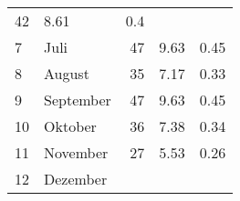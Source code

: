\begin{longtable}{lXrrr}
       \num{42} &
       \num[round-mode=places,round-precision=2]{8.61} &
         \num[round-mode=places,round-precision=2]{0.4} \\

     7 &
     \multicolumn{1}{X}{ Juli   } &


       \num{47} &
       \num[round-mode=places,round-precision=2]{9.63} &
         \num[round-mode=places,round-precision=2]{0.45} \\

     8 &
     \multicolumn{1}{X}{ August   } &


       \num{35} &
       \num[round-mode=places,round-precision=2]{7.17} &
         \num[round-mode=places,round-precision=2]{0.33} \\

     9 &
     \multicolumn{1}{X}{ September   } &


       \num{47} &
       \num[round-mode=places,round-precision=2]{9.63} &
         \num[round-mode=places,round-precision=2]{0.45} \\

     10 &
     \multicolumn{1}{X}{ Oktober   } &


       \num{36} &
       \num[round-mode=places,round-precision=2]{7.38} &
         \num[round-mode=places,round-precision=2]{0.34} \\

     11 &
     \multicolumn{1}{X}{ November   } &


       \num{27} &
       \num[round-mode=places,round-precision=2]{5.53} &
         \num[round-mode=places,round-precision=2]{0.26} \\

     12 &
     \multicolumn{1}{X}{ Dezember   } &



\end{longtable}
